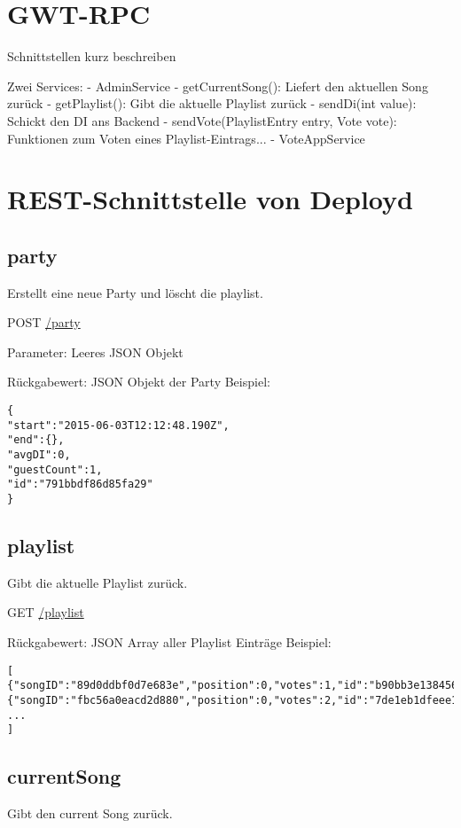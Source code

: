 \section{GWT-RPC}

Schnittstellen kurz beschreiben

Zwei Services:
- AdminService
	- getCurrentSong(): Liefert den aktuellen Song zurück
	- getPlaylist(): Gibt die aktuelle Playlist zurück
	- sendDi(int value): Schickt den DI ans Backend
	- sendVote(PlaylistEntry entry, Vote vote): Funktionen zum Voten eines Playlist-Eintrags...
- VoteAppService

\section{REST-Schnittstelle von Deployd}

\subsection{party}
\label{service:party}
Erstellt eine neue Party und löscht die playlist.

POST
\url{/party}

Parameter: Leeres JSON Objekt

Rückgabewert: JSON Objekt der Party
Beispiel:
\begin{lstlisting}
{
"start":"2015-06-03T12:12:48.190Z",
"end":{},
"avgDI":0,
"guestCount":1,
"id":"791bbdf86d85fa29"
}
\end{lstlisting}

\subsection{playlist}
\label{service:playlist}
Gibt die aktuelle Playlist zurück.

GET
\url{/playlist}

Rückgabewert: JSON Array aller Playlist Einträge
Beispiel:
\begin{lstlisting}
[
{"songID":"89d0ddbf0d7e683e","position":0,"votes":1,"id":"b90bb3e138456920"},
{"songID":"fbc56a0eacd2d880","position":0,"votes":2,"id":"7de1eb1dfeee188e"},
...
]
\end{lstlisting}


\subsection{currentSong}
\label{service:currentSong}
Gibt den current Song zurück.


